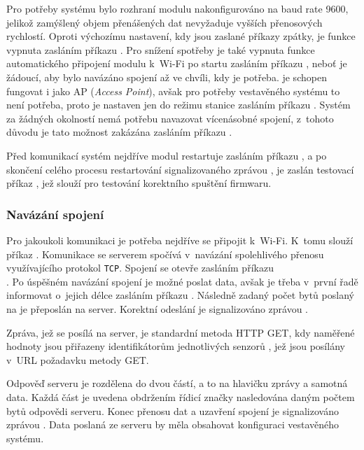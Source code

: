         Pro potřeby systému bylo rozhraní modulu nakonfigurováno na baud rate 9600, jelikož zamýšlený objem přenášených dat nevyžaduje vyšších přenosových rychlostí. Oproti výchozímu nastavení, kdy jsou zaslané příkazy  zpátky, je funkce vypnuta zasláním příkazu . Pro snížení spotřeby je také vypnuta funkce automatického připojení modulu k~Wi-Fi po startu zasláním příkazu , neboť je žádoucí, aby bylo navázáno spojení až ve chvíli, kdy je potřeba.  je schopen fungovat i jako AP (\textit{Access Point}), avšak pro potřeby vestavěného systému to není potřeba, proto je  nastaven jen do režimu stanice zasláním příkazu . Systém za žádných okolností nemá potřebu navazovat vícenásobné spojení, z~tohoto důvodu je tato možnost zakázána zasláním příkazu .

        Před komunikací systém nejdříve modul restartuje zasláním příkazu , a po skončení celého procesu restartování signalizovaného zprávou , je zaslán testovací příkaz , jež slouží pro testování korektního spuštění  firmwaru. 

        \subsubsection{Navázání spojení}
            Pro jakoukoli komunikaci je potřeba nejdříve se připojit k~Wi-Fi. K~tomu slouží příkaz . Komunikace se serverem spočívá v~navázání spolehlivého přenosu využívajícího protokol \texttt{TCP}. Spojení se otevře zasláním příkazu \\. Po úspěšném navázání spojení je možné poslat data, avšak je třeba v~první řadě informovat  o~jejich délce zasláním příkazu . Následně zadaný počet bytů poslaný na  je přeposlán na server. Korektní odeslání je signalizováno zprávou .

            Zpráva, jež se posílá na server, je standardní metoda HTTP GET, kdy naměřené hodnoty jsou přiřazeny identifikátorům jednotlivých senzorů , jež jsou posílány v~URL požadavku metody GET.

            Odpověď serveru je rozdělena do dvou částí, a to na hlavičku zprávy a samotná data. Každá část je uvedena obdržením řídicí značky  nasledována daným počtem bytů odpovědi serveru. Konec přenosu dat a uzavření spojení je signalizováno zprávou . Data poslaná ze serveru by měla obsahovat konfiguraci vestavěného systému.

